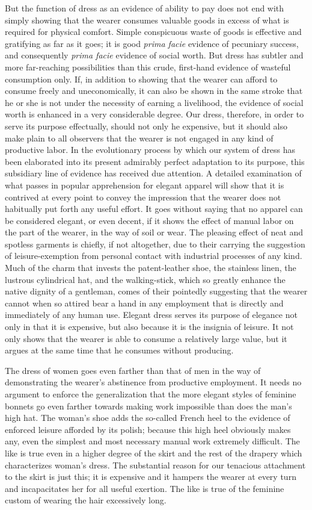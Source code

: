\documentclass[12pt]{report}
\begin{document}
But the function of dress as an evidence of ability to pay does not end
with simply showing that the wearer consumes valuable goods in excess of
what is required for physical comfort. Simple conspicuous waste of goods
is effective and gratifying as far as it goes; it is good \emph{prima facie}
evidence of pecuniary success, and consequently \emph{prima facie} evidence of
social worth. But dress has subtler and more far-reaching possibilities
than this crude, first-hand evidence of wasteful consumption only. If,
in addition to showing that the wearer can afford to consume freely and
uneconomically, it can also be shown in the same stroke that he or she
is not under the necessity of earning a livelihood, the evidence of
social worth is enhanced in a very considerable degree. Our dress,
therefore, in order to serve its purpose effectually, should not only
he expensive, but it should also make plain to all observers that
the wearer is not engaged in any kind of productive labor. In the
evolutionary process by which our system of dress has been elaborated
into its present admirably perfect adaptation to its purpose, this
subsidiary line of evidence has received due attention. A detailed
examination of what passes in popular apprehension for elegant apparel
will show that it is contrived at every point to convey the impression
that the wearer does not habitually put forth any useful effort. It
goes without saying that no apparel can be considered elegant, or
even decent, if it shows the effect of manual labor on the part of the
wearer, in the way of soil or wear. The pleasing effect of neat and
spotless garments is chiefly, if not altogether, due to their carrying
the suggestion of leisure-exemption from personal contact with
industrial processes of any kind. Much of the charm that invests the
patent-leather shoe, the stainless linen, the lustrous cylindrical hat,
and the walking-stick, which so greatly enhance the native dignity of
a gentleman, comes of their pointedly suggesting that the wearer cannot
when so attired bear a hand in any employment that is directly and
immediately of any human use. Elegant dress serves its purpose of
elegance not only in that it is expensive, but also because it is
the insignia of leisure. It not only shows that the wearer is able to
consume a relatively large value, but it argues at the same time that he
consumes without producing.

The dress of women goes even farther than that of men in the way of
demonstrating the wearer's abstinence from productive employment. It
needs no argument to enforce the generalization that the more elegant
styles of feminine bonnets go even farther towards making work
impossible than does the man's high hat. The woman's shoe adds the
so-called French heel to the evidence of enforced leisure afforded
by its polish; because this high heel obviously makes any, even the
simplest and most necessary manual work extremely difficult. The like
is true even in a higher degree of the skirt and the rest of the drapery
which characterizes woman's dress. The substantial reason for our
tenacious attachment to the skirt is just this; it is expensive and it
hampers the wearer at every turn and incapacitates her for all useful
exertion. The like is true of the feminine custom of wearing the hair
excessively long.
\end{document}

